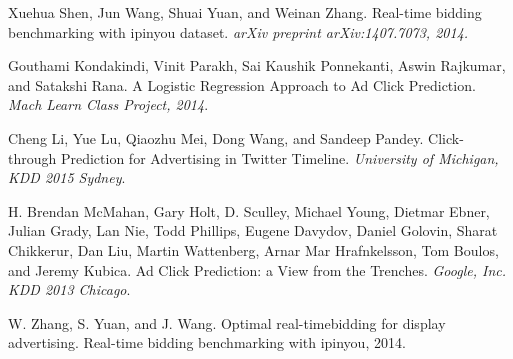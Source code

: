 \documentclass{sig-alternate-05-2015}
\begin{document}
\begin{thebibliography}{4}
Xuehua Shen, Jun Wang, Shuai Yuan, and Weinan Zhang.
Real-time bidding benchmarking with ipinyou
dataset.
\textit{arXiv preprint arXiv:1407.7073, 2014.}

Gouthami Kondakindi, Vinit Parakh, Sai Kaushik Ponnekanti, Aswin Rajkumar, and Satakshi Rana.
A Logistic Regression Approach to Ad Click
Prediction.
\textit{Mach Learn Class Project, 2014}.

Cheng Li, Yue Lu, Qiaozhu Mei, Dong Wang, and Sandeep Pandey.
Click-through Prediction for Advertising in Twitter Timeline.
\textit{University of Michigan, KDD 2015 Sydney}.

H. Brendan McMahan, Gary Holt, D. Sculley, Michael Young, Dietmar Ebner, Julian Grady, Lan Nie, Todd Phillips, Eugene Davydov, Daniel Golovin, Sharat Chikkerur, Dan Liu, Martin Wattenberg, Arnar Mar Hrafnkelsson, Tom Boulos, and Jeremy Kubica.
Ad Click Prediction: a View from the Trenches.
\textit{Google, Inc. KDD 2013 Chicago}.

W. Zhang, S. Yuan, and J. Wang.
Optimal real-timebidding for display advertising.
Real-time bidding benchmarking with ipinyou, 2014.

\end{thebibliography}
\end{document}
